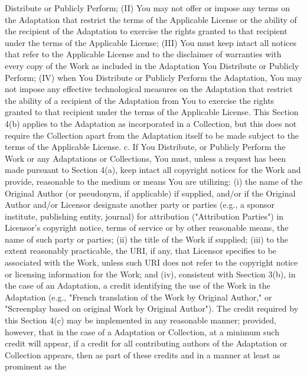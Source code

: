     Distribute or Publicly Perform; (II) You may not offer or impose any
    terms on the Adaptation that restrict the terms of the Applicable
    License or the ability of the recipient of the Adaptation to exercise
    the rights granted to that recipient under the terms of the Applicable
    License; (III) You must keep intact all notices that refer to the
    Applicable License and to the disclaimer of warranties with every copy
    of the Work as included in the Adaptation You Distribute or Publicly
    Perform; (IV) when You Distribute or Publicly Perform the Adaptation,
    You may not impose any effective technological measures on the
    Adaptation that restrict the ability of a recipient of the Adaptation
    from You to exercise the rights granted to that recipient under the
    terms of the Applicable License. This Section 4(b) applies to the
    Adaptation as incorporated in a Collection, but this does not require
    the Collection apart from the Adaptation itself to be made subject to
    the terms of the Applicable License.
 c. If You Distribute, or Publicly Perform the Work or any Adaptations or
    Collections, You must, unless a request has been made pursuant to
    Section 4(a), keep intact all copyright notices for the Work and
    provide, reasonable to the medium or means You are utilizing: (i) the
    name of the Original Author (or pseudonym, if applicable) if supplied,
    and/or if the Original Author and/or Licensor designate another party
    or parties (e.g., a sponsor institute, publishing entity, journal) for
    attribution ("Attribution Parties") in Licensor's copyright notice,
    terms of service or by other reasonable means, the name of such party
    or parties; (ii) the title of the Work if supplied; (iii) to the
    extent reasonably practicable, the URI, if any, that Licensor
    specifies to be associated with the Work, unless such URI does not
    refer to the copyright notice or licensing information for the Work;
    and (iv), consistent with Ssection 3(b), in the case of an
    Adaptation, a credit identifying the use of the Work in the Adaptation
    (e.g., "French translation of the Work by Original Author," or
    "Screenplay based on original Work by Original Author"). The credit
    required by this Section 4(c) may be implemented in any reasonable
    manner; provided, however, that in the case of a Adaptation or
    Collection, at a minimum such credit will appear, if a credit for all
    contributing authors of the Adaptation or Collection appears, then as
    part of these credits and in a manner at least as prominent as the
